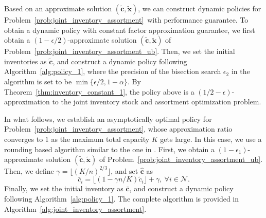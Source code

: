 \documentclass[mnsc,non-blindrev]{informs3}
\theoremstyle{definition}
\begin{document}
\begin{appendices}{\Large{}}
{Based on an approximate solution $(\tilde{\bm{c}},\tilde{\bm{x}})$, we can construct dynamic policies for Problem~\eqref{prob:joint_inventory_assortment}~with performance guarantee. To obtain a dynamic policy with constant factor approximation guarantee, we first obtain a $(1-\epsilon/2)$-approximate solution $(\tilde{\bm{c}},\tilde{\bm{x}})$ of Problem~\eqref{prob:joint_inventory_assortment_ub}. Then, we set the initial inventories as $\tilde{\bm{c}}$, and construct a dynamic policy following Algorithm~\ref{alg:policy_1}, where the precision of the bisection search $\epsilon_2$ in the algorithm is set to be $\min\{\epsilon/2,1-\alpha\}$. By Theorem~\ref{thm:inventory_constant_1}, the policy above is a $(1/2-\epsilon)$-approximation to the joint inventory stock and assortment optimization problem.

In what follows, we establish an asymptotically optimal policy for Problem~\eqref{prob:joint_inventory_assortment}, whose approximation ratio converges to $1$ as the maximum total capacity $K$ gets large. In this case, we use a rounding based algorithm similar to the one in \cite{bai2022coordinated}. First, we obtain a $(1-\epsilon_1)$-approximate solution $(\tilde{\bm{c}},\tilde{\bm{x}})$ of Problem~\eqref{prob:joint_inventory_assortment_ub}. Then, we define $\gamma=\lfloor(K/n)^{2/3}\rfloor$, and set $\hat{\bm{c}}$ as
\begin{equation}\label{eq:bar_c}
\bar{c}_i=\lfloor(1-\gamma n/K)\tilde{c}_i\rfloor+\gamma,\ \forall i\in\mathcal{N}.
\end{equation}
Finally, we set the initial inventory as $\bar{\bm{c}}$, and construct a dynamic policy following Algorithm~\ref{alg:policy_1}. The complete algorithm is provided in Algorithm~\ref{alg:joint_inventory_assortment}.

}
\end{appendices}
\end{document}
